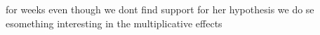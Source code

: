 for weeks even though we dont find support for her hypothesis we do se esomething interesting in the multiplicative effects






